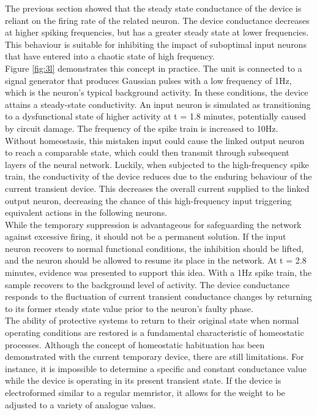 \noindent The previous section showed that the steady state conductance of the device is reliant on the firing rate of the related neuron. The device conductance decreases at higher spiking frequencies, but has a greater steady state at lower frequencies. This behaviour is suitable for inhibiting the impact of suboptimal input neurons that have entered into a chaotic state of high frequency.\\

\noindent Figure \ref{fig:3l} demonstrates this concept in practice. The unit is connected to a signal generator that produces Gaussian pulses with a low frequency of 1Hz, which is the neuron's typical background activity. In these conditions, the device attains a steady-state conductivity. An input neuron is simulated as transitioning to a dysfunctional state of higher activity at t = 1.8 minutes, potentially caused by circuit damage. The frequency of the spike train is increased to 10Hz. \\

\noindent Without homeostasis, this mistaken input could cause the linked output neuron to reach a comparable state, which could then transmit through subsequent layers of the neural network. Luckily, when subjected to the high-frequency spike train, the conductivity of the device reduces due to the enduring behaviour of the current transient device. This decreases the overall current supplied to the linked output neuron, decreasing the chance of this high-frequency input triggering equivalent actions in the following neurons.\\

\noindent  While the temporary suppression is advantageous for safeguarding the network against excessive firing, it should not be a permanent solution. If the input neuron recovers to normal functional conditions, the inhibition should be lifted, and the neuron should be allowed to resume its place in the network. At t = 2.8 minutes, evidence was presented to support this idea. With a 1Hz spike train, the sample recovers to the background level of activity. The device conductance responds to the fluctuation of current transient conductance changes by returning to its former steady state value prior to the neuron's faulty phase. \\

\noindent The ability of protective systems to return to their original state when normal operating conditions are restored is a fundamental characteristic of homeostatic processes. Although the concept of homeostatic habituation has been demonstrated with the current temporary device, there are still limitations. For instance, it is impossible to determine a specific and constant conductance value while the device is operating in its present transient state. If the device is electroformed similar to a regular memristor, it allows for the weight to be adjusted to a variety of analogue values.\\

